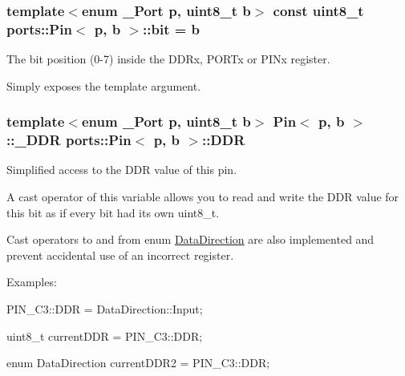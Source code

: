 \subsubsection[{\texorpdfstring{bit}{bit}}]{\setlength{\rightskip}{0pt plus 5cm}template$<$enum \+\_\+\+Port p, uint8\+\_\+t b$>$ const uint8\+\_\+t {\bf ports\+::\+Pin}$<$ p, b $>$\+::bit = b\hspace{0.3cm}{\ttfamily [static]}}\hypertarget{structports_1_1Pin_aea726b85cfe5e49822dd2517da5c860f}{}\label{structports_1_1Pin_aea726b85cfe5e49822dd2517da5c860f}


The bit position (0-\/7) inside the D\+D\+Rx, P\+O\+R\+Tx or P\+I\+Nx register. 

Simply exposes the template argument. 
\subsubsection[{\texorpdfstring{D\+DR}{DDR}}]{\setlength{\rightskip}{0pt plus 5cm}template$<$enum \+\_\+\+Port p, uint8\+\_\+t b$>$ {\bf Pin}$<$ p, b $>$\+::{\bf \+\_\+\+D\+DR} {\bf ports\+::\+Pin}$<$ p, b $>$\+::D\+DR\hspace{0.3cm}{\ttfamily [static]}}\hypertarget{structports_1_1Pin_aaebb4d6cb5db0635fe8e7d6e7d315c7f}{}\label{structports_1_1Pin_aaebb4d6cb5db0635fe8e7d6e7d315c7f}


Simplified access to the D\+DR value of this pin. 

A cast operator of this variable allows you to read and write the D\+DR value for this bit as if every bit had its own {\ttfamily uint8\+\_\+t}.

Cast operators to and from enum \hyperlink{namespaceports_a46987e78fa447129742fadda5eccafb4}{Data\+Direction} are also implemented and prevent accidental use of an incorrect register.

Examples\+:


\begin{DoxyItemize}
\item {\ttfamily P\+I\+N\+\_\+\+C3\+::\+D\+DR = Data\+Direction\+::\+Input;}
\item {\ttfamily uint8\+\_\+t current\+D\+DR = P\+I\+N\+\_\+\+C3\+::\+D\+DR;}
\item {\ttfamily enum Data\+Direction current\+D\+D\+R2 = P\+I\+N\+\_\+\+C3\+::\+D\+DR;} 
\end{DoxyItemize}
